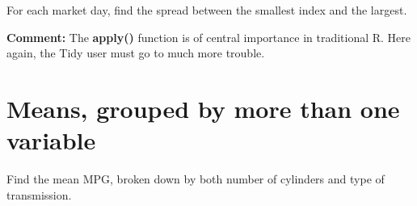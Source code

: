 \documentclass[11pt]{article}
\begin{document}
For each market day, find the spread between the smallest index and the
largest.


\begin{parcolumns}[rulebetween=true]{2}


\hspace{0.1in}


\end{parcolumns}

\textbf{Comment:} The \textbf{apply()} function is of central importance
in traditional R.  Here again, the Tidy user must go to much more
trouble.

\section*{Means, grouped by more than one variable}

Find the mean MPG, broken down by both number of cylinders and type of
transmission.
\end{document}
